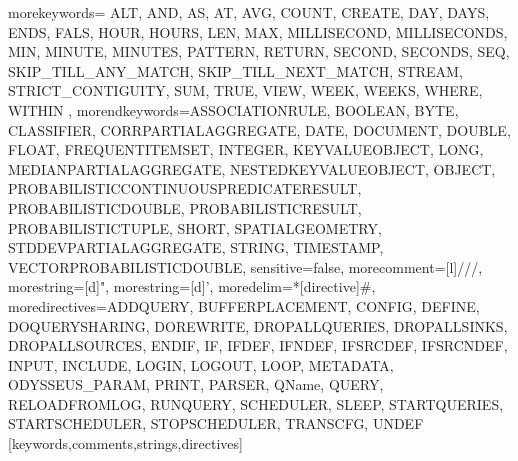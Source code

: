    {morekeywords={%
ALT, AND, AS, AT, AVG, COUNT, CREATE, DAY, DAYS, ENDS, FALS, HOUR, HOURS, LEN, MAX, MILLISECOND, MILLISECONDS, MIN, MINUTE, MINUTES, PATTERN, RETURN, SECOND, SECONDS, SEQ, SKIP_TILL_ANY_MATCH, SKIP_TILL_NEXT_MATCH, STREAM, STRICT_CONTIGUITY, SUM, TRUE, VIEW, WEEK, WEEKS, WHERE, WITHIN%
      },%
   morendkeywords={ASSOCIATIONRULE, BOOLEAN, BYTE, CLASSIFIER, CORRPARTIALAGGREGATE, DATE, DOCUMENT, DOUBLE, FLOAT, FREQUENTITEMSET, INTEGER, KEYVALUEOBJECT, LONG, MEDIANPARTIALAGGREGATE, NESTEDKEYVALUEOBJECT, OBJECT, PROBABILISTICCONTINUOUSPREDICATERESULT, PROBABILISTICDOUBLE, PROBABILISTICRESULT, PROBABILISTICTUPLE, SHORT, SPATIALGEOMETRY, STDDEVPARTIALAGGREGATE, STRING, TIMESTAMP, VECTORPROBABILISTICDOUBLE},%
   sensitive=false,
   morecomment=[l]///,%
   morestring=[d]",%
   morestring=[d]',%
   moredelim=*[directive]\#,%
   moredirectives={ADDQUERY, BUFFERPLACEMENT, CONFIG, DEFINE, DOQUERYSHARING, DOREWRITE, DROPALLQUERIES, DROPALLSINKS, DROPALLSOURCES, ENDIF, IF, IFDEF, IFNDEF, IFSRCDEF, IFSRCNDEF, INPUT, INCLUDE, LOGIN, LOGOUT, LOOP, METADATA, ODYSSEUS_PARAM, PRINT, PARSER, QName, QUERY, RELOADFROMLOG, RUNQUERY, SCHEDULER, SLEEP, STARTQUERIES, STARTSCHEDULER, STOPSCHEDULER, TRANSCFG, UNDEF}%
}[keywords,comments,strings,directives]

